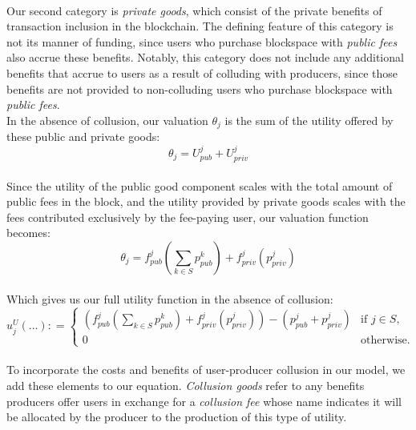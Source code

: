 \documentclass[11pt,a4paper]{llncs}
\begin{document}
\vspace{0.2cm} \\
Our second category is \textit{private goods}, which consist of the private benefits of transaction inclusion in the blockchain. The defining feature of this category is not its manner of funding, since users who purchase blockspace with \textit{public fees} also accrue these benefits. Notably, this category does not include any additional benefits that accrue to users as a result of colluding with producers, since those benefits are not provided to non-colluding users who purchase blockspace with \textit{public fees}.
\vspace{0.2cm} \\
In the absence of collusion, our valuation $\theta_j$ is the sum of the utility offered by these public and private goods:
\vspace{0.2cm} \\
$$
\theta_j = U_{pub}^j + U_{priv}^j
$$
\vspace{0.2cm} \\
Since the utility of the public good component scales with the total amount of public fees in the block, and the utility provided by private goods scales with the fees contributed exclusively by the fee-paying user, our valuation function becomes:
\vspace{0.2cm} \\
$$
\theta_j = f_{pub}^j\left(\sum_{k \in S} p_{pub}^{k}\right) + f_{priv}^j(p_{priv}^j)
$$
\vspace{0.2cm} \\
Which gives us our full utility function in the absence of collusion:
\vspace{0.2cm} \\
\[
u_j^U\left(...\right) : =
\begin{cases}
\left(
        f_{pub}^j
                \left(\sum_{k \in S} p_{pub}^{k}\right)
                + f_{priv}^j(p_{priv}^j)
\right)  -   \left(p_{pub}^j + p_{priv}^j\right) & \text{if } j \in S, \\ 0 & \text{otherwise.}
\end{cases}
\]
\vspace{0.2cm} \\
To incorporate the costs and benefits of user-producer collusion in our model, we add these elements to our equation. \textit{Collusion goods} refer to any benefits producers offer users in exchange for a \textit{collusion fee} whose name indicates it will be allocated by the producer to the production of this type of utility.
\end{document}
